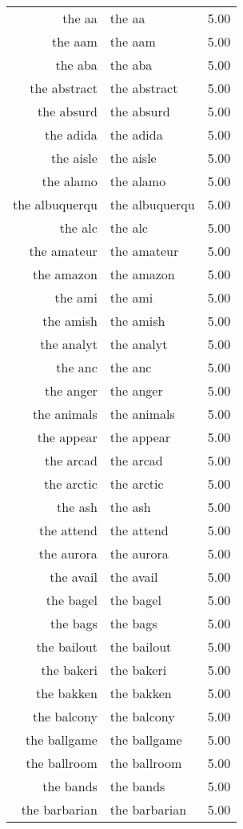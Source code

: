 \begin{table}[ht]
\begin{tabular}{rlr}
  the aa & the aa & 5.00 \\ 
  the aam & the aam & 5.00 \\ 
  the aba & the aba & 5.00 \\ 
  the abstract & the abstract & 5.00 \\ 
  the absurd & the absurd & 5.00 \\ 
  the adida & the adida & 5.00 \\ 
  the aisle & the aisle & 5.00 \\ 
  the alamo & the alamo & 5.00 \\ 
  the albuquerqu & the albuquerqu & 5.00 \\ 
  the alc & the alc & 5.00 \\ 
  the amateur & the amateur & 5.00 \\ 
  the amazon & the amazon & 5.00 \\ 
  the ami & the ami & 5.00 \\ 
  the amish & the amish & 5.00 \\ 
  the analyt & the analyt & 5.00 \\ 
  the anc & the anc & 5.00 \\ 
  the anger & the anger & 5.00 \\ 
  the animals & the animals & 5.00 \\ 
  the appear & the appear & 5.00 \\ 
  the arcad & the arcad & 5.00 \\ 
  the arctic & the arctic & 5.00 \\ 
  the ash & the ash & 5.00 \\ 
  the attend & the attend & 5.00 \\ 
  the aurora & the aurora & 5.00 \\ 
  the avail & the avail & 5.00 \\ 
  the bagel & the bagel & 5.00 \\ 
  the bags & the bags & 5.00 \\ 
  the bailout & the bailout & 5.00 \\ 
  the bakeri & the bakeri & 5.00 \\ 
  the bakken & the bakken & 5.00 \\ 
  the balcony & the balcony & 5.00 \\ 
  the ballgame & the ballgame & 5.00 \\ 
  the ballroom & the ballroom & 5.00 \\ 
  the bands & the bands & 5.00 \\ 
  the barbarian & the barbarian & 5.00 \\ 

\end{tabular}
\end{table}
